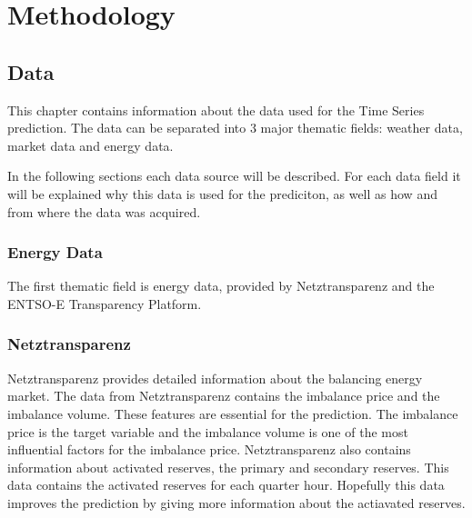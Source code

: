 \documentclass[class=scrbook, crop=false]{standalone}
\begin{document}
\chapter{Methodology} %
\label{Chapter::Methodology}

\section{Data}
\label{Chapter::Data}
This chapter contains information about the data used for the Time Series prediction. 
The data can be separated into 3 major thematic fields: weather data, market data and energy data.

In the following sections each data source will be described. 
For each data field it will be explained why this data is used for the prediciton, as well as  how and from where the data was acquired.



\subsection{Energy Data}
\label{Section::Energy_Data}

The first thematic field is energy data, provided by Netztransparenz and the ENTSO-E Transparency Platform.
\subsection{Netztransparenz}
Netztransparenz provides detailed information about the balancing energy market. 
The data from Netztransparenz contains the imbalance price and the imbalance volume.
These features are essential for the prediction. 
The imbalance price is the target variable and the imbalance volume is one of the most influential factors for the imbalance price.
Netztransparenz also contains information about activated reserves, the primary and secondary reserves.
This data contains the activated reserves for each quarter hour. 
Hopefully this data improves the prediction by giving more information about the actiavated reserves.
\end{document}
